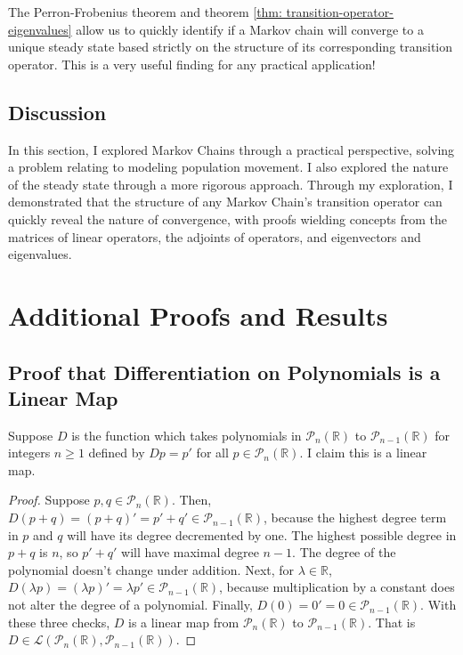 \documentclass{article}
\renewcommand{\L}{\mathcal{L}}
\newcommand{\R}{\mathbb{R}}
\theoremstyle{definition}
\begin{document}
The Perron-Frobenius theorem and theorem \ref{thm: transition-operator-eigenvalues} allow us to quickly identify if a Markov chain will converge to a unique steady state based strictly on the structure of its corresponding transition operator. This is a very useful finding for any practical application!

\subsection{Discussion}

In this section, I explored Markov Chains through a practical perspective, solving a problem relating to modeling population movement. I also explored the nature of the steady state through a more rigorous approach. Through my exploration, I demonstrated that the structure of any Markov Chain's transition operator can quickly reveal the nature of convergence, with proofs wielding concepts from the matrices of linear operators, the adjoints of operators, and eigenvectors and eigenvalues. 


\newpage



\appendix
\section{Additional Proofs and Results}

\subsection{Proof that Differentiation on Polynomials is a Linear Map}
\label{sec: differentiation-map-proof}

Suppose $D$ is the function which takes polynomials in $\mathcal{P}_n(\R)$ to $\mathcal{P}_{n - 1}(\R)$ for integers $n \geq 1$ defined by $Dp = p'$ for all $p \in \mathcal{P}_n(\R)$. I claim this is a linear map.

\begin{proof}
    Suppose $p, q \in \mathcal{P}_n(\R)$. Then, $D(p + q) = (p + q)' = p' + q' \in \mathcal{P}_{n - 1}(\R)$, because the highest degree term in $p$ and $q$ will have its degree decremented by one. The highest possible degree in $p + q$ is $n$, so $p' + q'$ will have maximal degree $n - 1$. The degree of the polynomial doesn't change under addition. Next, for $\lambda \in \R$, $D(\lambda p) = (\lambda p)' = \lambda p' \in \mathcal{P}_{n - 1}(\R)$, because multiplication by a constant does not alter the degree of a polynomial. Finally, $D(0) = 0' = 0 \in \mathcal{P}_{n - 1}(\R)$. With these three checks, $D$ is a linear map from $\mathcal{P}_n(\R)$ to $\mathcal{P}_{n - 1}(\R)$. That is $D \in \L(\mathcal{P}_n(\R), \mathcal{P}_{n - 1}(\R))$.
\end{proof}
\end{document}
